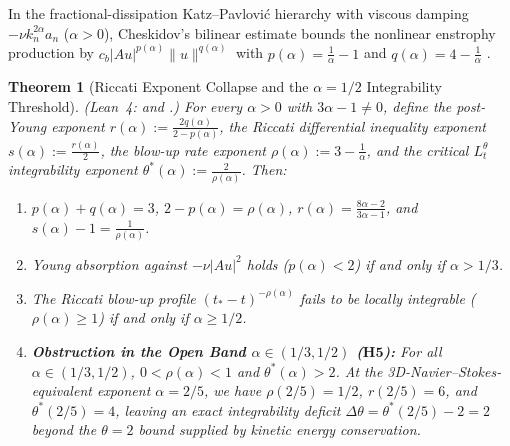 \documentclass[11pt,a4paper]{article}
\newtheorem{theorem}{Theorem}[section]
\theoremstyle{definition}
\theoremstyle{remark}
\begin{document}
In the fractional-dissipation Katz--Pavlovi\'c hierarchy with viscous damping $-\nu k_n^{2\alpha} a_n$ ($\alpha > 0$), Cheskidov's bilinear estimate bounds the nonlinear enstrophy production by $c_b |A u|^{p(\alpha)} \|u\|^{q(\alpha)}$ with $p(\alpha) = \frac{1}{\alpha} - 1$ and $q(\alpha) = 4 - \frac{1}{\alpha}$ \cite{Cheskidov2008}.

\begin{theorem}[Riccati Exponent Collapse and the $\alpha = 1/2$ Integrability Threshold]\label{thm:riccati}
\emph{(Lean~4:  and .)} For every $\alpha > 0$ with $3\alpha - 1 \ne 0$, define the post-Young exponent $r(\alpha) := \frac{2q(\alpha)}{2-p(\alpha)}$, the Riccati differential inequality exponent $s(\alpha) := \frac{r(\alpha)}{2}$, the blow-up rate exponent $\rho(\alpha) := 3 - \frac{1}{\alpha}$, and the critical $L^\theta_t$ integrability exponent $\theta^*(\alpha) := \frac{2}{\rho(\alpha)}$. Then:
\begin{enumerate}
\item $p(\alpha) + q(\alpha) = 3$, $2 - p(\alpha) = \rho(\alpha)$, $r(\alpha) = \frac{8\alpha - 2}{3\alpha - 1}$, and $s(\alpha) - 1 = \frac{1}{\rho(\alpha)}$.
\item Young absorption against $-\nu |A u|^2$ holds ($p(\alpha) < 2$) if and only if $\alpha > 1/3$.
\item The Riccati blow-up profile $(t_* - t)^{-\rho(\alpha)}$ fails to be locally integrable ($\rho(\alpha) \ge 1$) if and only if $\alpha \ge 1/2$.
\item \textbf{Obstruction in the Open Band $\alpha \in (1/3, 1/2)$ ($\mathbf{H5}$):} For all $\alpha \in (1/3, 1/2)$, $0 < \rho(\alpha) < 1$ and $\theta^*(\alpha) > 2$. At the 3D-Navier--Stokes-equivalent exponent $\alpha = 2/5$, we have $\rho(2/5) = 1/2$, $r(2/5) = 6$, and $\theta^*(2/5) = 4$, leaving an exact integrability deficit $\Delta\theta = \theta^*(2/5) - 2 = 2$ beyond the $\theta = 2$ bound supplied by kinetic energy conservation.
\end{enumerate}
\end{theorem}
\end{document}
